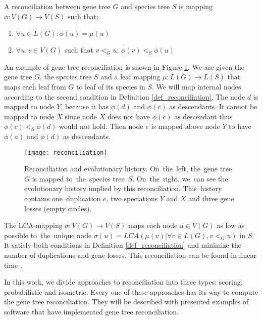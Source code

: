 \begin{definition}
A reconciliation between gene tree $G$ and species tree $S$ is mapping $\phi: V(G) \rightarrow V(S)$ such that:
	\begin{enumerate}\itemsep0em
	\item $\forall u \in L(G): \phi(u) = \mu(u)$
	\item $\forall u, v \in V(G)$ such that $v<_Gu$: $\phi(v)<_S\phi(u)$
	\end{enumerate}
	\label{def_reconciliation}
\end{definition}

An example of gene tree reconciliation is shown in Figure \ref{reconciliation}. We are given the gene tree $G$, the species tree $S$ and a leaf mapping $\mu: L(G) \rightarrow L(S)$ that maps each leaf from $G$ to leaf of its species in $S$. We will map internal nodes according to the second condition in Definition \ref{def_reconciliation}. The node $d$ is mapped to node $Y$, because it has $\phi(d)$ and $\phi(c)$ as descendants. It cannot be mapped to node $X$ since node $X$ does not have $\phi(c)$ as descendant thus $\phi(c)<_S\phi(d)$ would not hold. Then node $e$ is mapped above node $Y$ to have $\phi(a)$ and $\phi(d)$ as descendants.

\begin{figure}[ht]
	\centering
	\label{reconciliation}
  	\texttt{[image: reconciliation]}
  	\caption[Reconciliation and evolutionary history]{Reconciliation and evolutionary history. On~the~left, the~gene tree~$G$ is mapped to~the~species tree~$S$. On~the~right, we~can see the evolutionary history implied by this reconciliation. This~history contains one~duplication $e$, two speciations $Y$ and $X$ and three gene losses (empty circles).}
\end{figure}

The LCA-mapping $\sigma: V(G) \rightarrow V(S)$ maps each node $u \in V(G)$ as low as possible to~the~unique node $\sigma(u) = LCA(\mu(v) | \forall v \in L(G), v<_Gu)$ in $S$. It satisfy both conditions in Definition \ref{def_reconciliation} and minimize the number of duplications and gene losses. This reconciliation can be found in linear time \cite{hasic}.

In this work, we divide approaches to reconciliation into three types: scoring, probabilistic and isometric. Every one of these approaches has its way to compute the gene tree reconciliation. They will be described with presented examples of software that have implemented gene tree reconciliation. 

